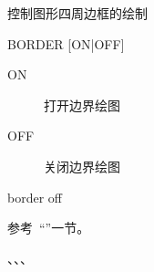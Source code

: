 \label{cmd:border}

控制图形四周边框的绘制

\begin{SACSTX}
BORDER [ON|OFF]
\end{SACSTX}

\begin{description}
\item [ON] 打开边界绘图
\item [OFF] 关闭边界绘图 
\end{description}

\begin{SACDFT}
border off
\end{SACDFT}

参考~``''一节。

、、、
